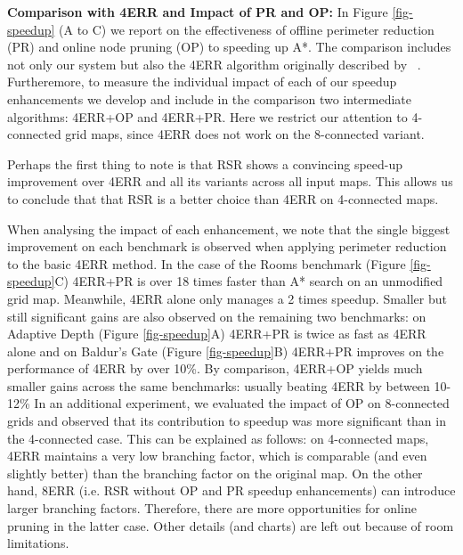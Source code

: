 \textbf{Comparison with 4ERR and Impact of PR and OP:}
In Figure \ref{fig-speedup} (A to C) we report on the 
effectiveness of offline perimeter reduction (PR) and online 
node pruning (OP) to speeding up A*.
The comparison includes not only our system
but also the 4ERR algorithm originally described by \citeauthor{harabor10}~.
Furtheremore, to measure the individual impact of each of our speedup enhancements
we develop and include in the comparison two intermediate algorithms: 4ERR+OP and 4ERR+PR.
Here we restrict our attention to 4-connected grid maps,
since 4ERR does not work on the 8-connected variant.
\par
Perhaps the first thing to note is that RSR shows a convincing 
speed-up improvement over 4ERR and all its variants across all input maps.
This allows us to conclude that that RSR is a better choice than 4ERR on
4-connected maps.
\par
When analysing the impact of each enhancement,
we note that the single biggest improvement on each
benchmark is observed when applying perimeter reduction to the basic 4ERR method.
In the case of the Rooms benchmark (Figure \ref{fig-speedup}C) 4ERR+PR is over
18 times faster than A* search on an unmodified grid map.
Meanwhile, 4ERR alone only manages a 2 times speedup.
Smaller but still significant gains are also observed on the remaining two benchmarks:
on Adaptive Depth (Figure \ref{fig-speedup}A) 4ERR+PR is twice as fast as 4ERR alone
and on Baldur's Gate (Figure \ref{fig-speedup}B) 4ERR+PR improves on
the performance of 4ERR by over 10\%.
By comparison, 4ERR+OP yields much smaller gains across the same
benchmarks: usually beating 4ERR by between 10-12\%
In an additional experiment, we evaluated the impact of OP on 8-connected
grids and observed that its contribution to speedup was more significant than in 
the 4-connected case.
This can be explained as follows: on 4-connected maps, 4ERR maintains a very low
branching factor, which is comparable (and even slightly better) than the branching
factor on the original map. 
On the other hand, 8ERR (i.e. RSR without OP and PR speedup enhancements) 
can introduce larger branching factors. Therefore, there are more opportunities for 
online pruning in the latter case. 
Other details (and charts) are left out because of room limitations.
\par
